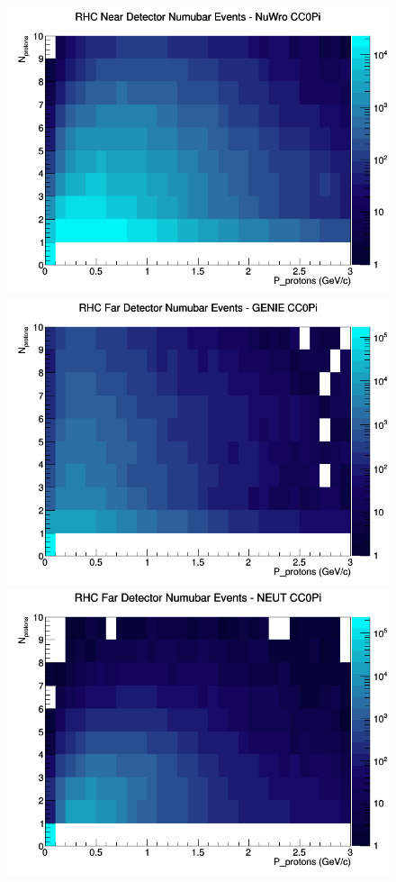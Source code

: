 \documentclass[12pt]{article}
\begin{document}
\begin{figure}[h]
\includegraphics[width=\linewidth]{N_P/nominal/protons/CC0Pi_RHC_ND_numubar_N_P_NuWro.png}
\endminipage
\newline
{}
\includegraphics[width=\linewidth]{N_P/nominal/protons/CC0Pi_RHC_FD_numubar_N_P_GENIE.png}
\endminipage
{}
\includegraphics[width=\linewidth]{N_P/nominal/protons/CC0Pi_RHC_FD_numubar_N_P_NEUT.png}

\end{figure}
\end{document}
